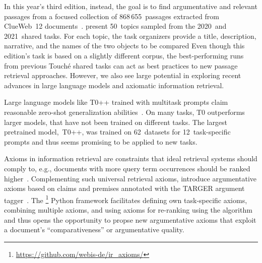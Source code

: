 In this year's third edition, instead, the goal is to find argumentative and relevant passages from a focused collection of 868\,655~passages extracted from ClueWeb~12 documents~\cite{BondarenkoFKSGBPBSWPH2022}.
\citeauthor{BondarenkoFKSGBPBSWPH2022} present 50~topics sampled from the 2020~and 2021~shared tasks. 
For each topic, the task organizers provide a title, description, narrative, and the names of the two objects to be compared
Even though this edition's task is based on a slightly different corpus, the best-performing runs from previous Touché shared tasks can act as best practices to new passage retrieval approaches.
However, we also see large potential in exploring recent advances in large language models and axiomatic information retrieval.

Large language models like T0++ trained with multitask prompts claim reasonable zero-shot generalization abilities~\cite{SanhWRBSACSLRDBXTSSKCNDCJWMSYPBWNRSSFFTBGBWR2021}.
On many tasks, T0 outperforms larger models, that have not been trained on different tasks. The largest pretrained model,~T0++, was trained on 62~datasets for 12~task-specific prompts and thus seems promising to be applied to new tasks.

Axioms in information retrieval are constraints that ideal retrieval systems should comply to, e.g., documents with more query term occurrences should be ranked higher~\citet{FangTZ2004}.
Complementing such universal retrieval axioms, \citet{BondarenkoHVSPB2018} introduce argumentative axioms based on claims and premises annotated with the TARGER argument tagger~\cite{ChernodubOHBHBP2019}.
The \iraxioms\footnote{\url{https://github.com/webis-de/ir_axioms/}} Python framework facilitates defining own task-specific axioms, combining multiple axioms, and using axioms for re-ranking using the \KwikSort algorithm~\cite{BondarenkoFRSVH2022,HagenVGS2016} and thus opens the opportunity to propse new argumentative axioms that exploit a document's ``comparativeness'' or argumentative quality.
